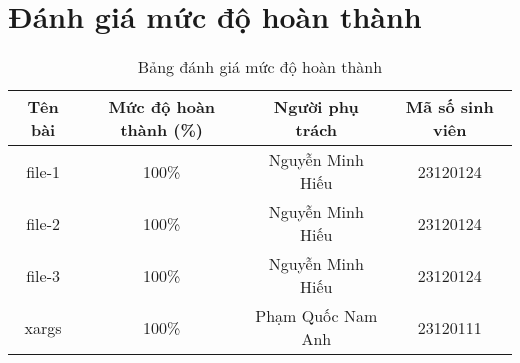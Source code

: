 \section{Đánh giá mức độ hoàn thành}

\begin{table}[H]
    \centering
    \begin{tabular}{|c|c|c|c|}
    \hline
    \textbf{Tên bài} & \textbf{Mức độ hoàn thành (\%)} & \textbf{Người phụ trách} & \textbf{Mã số sinh viên} \\ \hline
    file-1 & 100\% & Nguyễn Minh Hiếu & 23120124 \\ \hline
    file-2 & 100\% & Nguyễn Minh Hiếu & 23120124 \\ \hline
    file-3 & 100\% & Nguyễn Minh Hiếu & 23120124 \\ \hline
    xargs & 100\% & Phạm Quốc Nam Anh & 23120111 \\ \hline
    \end{tabular}
    \caption{Bảng đánh giá mức độ hoàn thành}
    \label{tab:hoanthanh}
\end{table}
